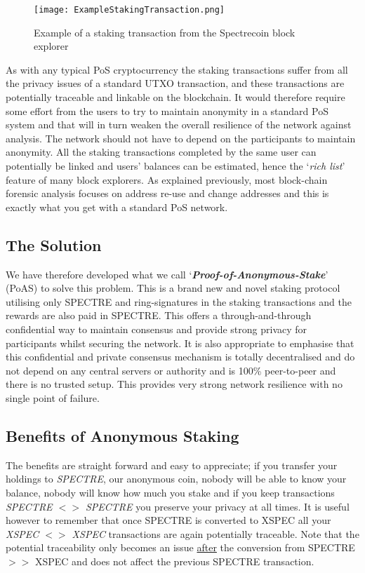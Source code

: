 \begin{figure}[ht]
	\caption{Example of a staking transaction from the Spectrecoin block explorer}
	\centering
	\texttt{[image: ExampleStakingTransaction.png]}
\end{figure}



As with any typical PoS cryptocurrency the staking transactions suffer
from all the privacy issues of a standard UTXO transaction, and these
transactions are potentially traceable and linkable on the blockchain.
It would therefore require some effort from the users to try to maintain
anonymity in a standard PoS system and that will in turn weaken the overall
resilience of the network against analysis. The network should not have to
depend on the participants to maintain anonymity. All the staking
transactions completed by the same user can potentially be linked and users’
balances can be estimated, hence the ‘\textit{rich list}’ feature of many
block explorers. As explained previously, most block-chain forensic analysis
focuses on address re-use and change addresses and this is exactly what you
get with a standard PoS network.



\subsection{The Solution}
We have therefore developed what we call ‘\textbf{\textit{Proof-of-Anonymous-Stake}}’
(PoAS) to solve this problem. This is a brand new and novel staking protocol
utilising only SPECTRE and ring-signatures in the staking transactions and
the rewards are also paid in SPECTRE. This offers a through-and-through
confidential way to maintain consensus and provide strong privacy for
participants whilst securing the network. It is also appropriate to emphasise
that this confidential and private consensus mechanism is totally
decentralised and do not depend on any central servers or authority and is
100\% peer-to-peer and there is no trusted setup. This provides very strong
network resilience with no single point of failure.



\subsection{Benefits of Anonymous Staking}
The benefits are straight forward and easy to appreciate; if you transfer
your holdings to \textit{SPECTRE}, our anonymous coin, nobody will be able
to know your balance, nobody will know how much you stake and if you keep
transactions \textit{SPECTRE $<>$ SPECTRE} you preserve your privacy at all
times. It is useful however to remember that once SPECTRE is converted to
XSPEC all your \textit{XSPEC $<>$ XSPEC} transactions are again potentially
traceable. Note that the potential traceability only becomes an issue
\underline{after} the conversion from SPECTRE $>>$ XSPEC and does not affect
the previous SPECTRE transaction.



